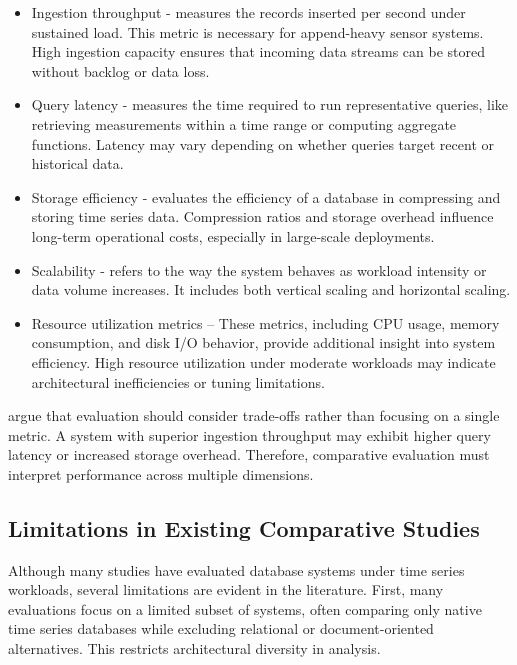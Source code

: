 \begin{itemize} 
    \item Ingestion throughput - measures the records inserted per second under sustained load. This metric is necessary for append-heavy sensor systems. High ingestion capacity ensures that incoming data streams can be stored without backlog or data loss.
    
    \item Query latency - measures the time required to run representative queries, like retrieving measurements within a time range or computing aggregate functions. Latency may vary depending on whether queries target recent or historical data.
    
    \item Storage efficiency - evaluates the efficiency of a database in compressing and storing time series data. Compression ratios and storage overhead influence long-term operational costs, especially in large-scale deployments.
    
    \item Scalability - refers to the way the system behaves as workload intensity or data volume increases. It includes both vertical scaling and horizontal scaling.
    
    \item Resource utilization metrics – These metrics, including CPU usage, memory consumption, and disk I/O behavior, provide additional insight into system efficiency. High resource utilization under moderate workloads may indicate architectural inefficiencies or tuning limitations.
\end{itemize}


\citet{khelifati2023tsmbench} argue that evaluation should consider trade-offs rather than focusing on a single metric. A system with superior ingestion throughput may exhibit higher query latency or increased storage overhead. Therefore, comparative evaluation must interpret performance across multiple dimensions.


\subsection{Limitations in Existing Comparative Studies}
Although many studies have evaluated database systems under time series workloads, several limitations are evident in the literature. First, many evaluations focus on a limited subset of systems, often comparing only native time series databases while excluding relational or document-oriented alternatives. This restricts architectural diversity in analysis.

